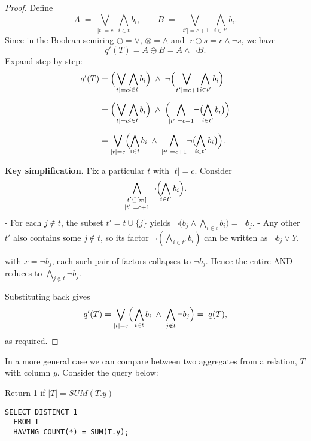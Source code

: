 \documentclass{article}
\begin{document}
\begin{proof}
Define
\[
A \;=\; \bigvee_{\lvert t\rvert = c}\;\bigwedge_{i\in t} b_i,
\qquad
B \;=\; \bigvee_{\lvert t'\rvert = c+1}\;\bigwedge_{i\in t'} b_i.
\]
Since in the Boolean semiring \(\oplus=\vee\), \(\otimes=\wedge\) and
\(\;r\ominus s = r\wedge\neg s\), we have
\[
q'(T)
= A \ominus B
= A \wedge \neg B.
\]
Expand step by step:
\begin{align*}
q'(T)
&= \Bigl(\!\bigvee_{\lvert t\rvert = c}\!\bigwedge_{i\in t}b_i\Bigr)
   \;\wedge\;
   \neg\Bigl(\!\bigvee_{\lvert t'\rvert = c+1}\!\bigwedge_{i\in t'}b_i\Bigr)\\[6pt]
&= \Bigl(\!\bigvee_{\lvert t\rvert = c}\!\bigwedge_{i\in t}b_i\Bigr)
   \;\wedge\;
   \Bigl(\!\bigwedge_{\lvert t'\rvert = c+1}\!\neg\bigl(\!\bigwedge_{i\in t'}b_i\bigr)\Bigr)\\[6pt]
&= \bigvee_{\lvert t\rvert = c}
    \Bigl(
      \bigwedge_{i\in t}b_i
      \;\wedge\;
      \bigwedge_{|t'|=c+1}\!\neg\bigl(\!\bigwedge_{i\in t'}b_i\bigr)
    \Bigr).
\end{align*}

\textbf{Key simplification.}  Fix a particular \(t\) with \(\lvert t\rvert=c\).  Consider
\[
\bigwedge_{\substack{t'\subseteq[m]\\|t'|=c+1}}
\neg\Bigl(\!\bigwedge_{i\in t'}b_i\Bigr).
\]
- For each \(j\notin t\), the subset \(t'=t\cup\{j\}\) yields
  \(\neg\bigl(b_j\wedge\bigwedge_{i\in t}b_i\bigr)=\neg b_j\).  
- Any other \(t'\) also contains some \(j\notin t\), so its factor
  \(\neg(\bigwedge_{i\in t'}b_i)\) can be written as
  \(\neg b_j\vee Y\).  

with \(x=\neg b_j\), each such pair of factors collapses to \(\neg b_j\).  Hence the entire
AND reduces to
\(\bigwedge_{j\notin t}\neg b_j\).

Substituting back gives
\[
q'(T)
=\bigvee_{\lvert t\rvert = c}
\Bigl(\,\bigwedge_{i\in t}b_i
       \;\wedge\;
       \bigwedge_{j\notin t}\neg b_j
\Bigr)
=\;q(T),
\]
as required.
\end{proof}

In a more general case we can compare between two aggregates from a 
relation, \(T\) with column \(y\). Consider the query below:

\begin{listing}[ht]
\caption{Return 1 if \(\lvert T\rvert = SUM(T.y)\)}
\begin{verbatim}
SELECT DISTINCT 1
  FROM T
  HAVING COUNT(*) = SUM(T.y);
\end{verbatim}
\end{listing}




\cite{amsterdamer2011provenance}


\end{document}
